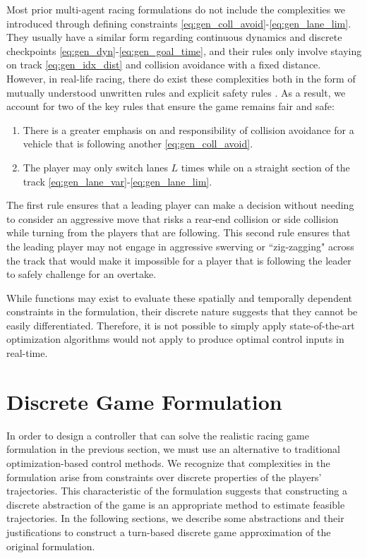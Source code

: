 Most prior multi-agent racing formulations \cite{Wang2019, Wang2021, Li2021} do not include the complexities we introduced through defining constraints \eqref{eq:gen_coll_avoid}-\eqref{eq:gen_lane_lim}. They usually have a similar form regarding continuous dynamics and discrete checkpoints \eqref{eq:gen_dyn}-\eqref{eq:gen_goal_time}, and their rules only involve staying on track \eqref{eq:gen_idx_dist} and collision avoidance with a fixed distance. However, in real-life racing, there do exist these complexities both in the form of mutually understood unwritten rules and explicit safety rules \cite{racingrules}. As a result, we account for two of the key rules that ensure the game remains fair and safe:
\begin{enumerate}
    \item There is a greater emphasis on and responsibility of collision avoidance for a vehicle that is following another \eqref{eq:gen_coll_avoid}.
    \item The player may only switch lanes $L$ times while on a straight section of the track \eqref{eq:gen_lane_var}-\eqref{eq:gen_lane_lim}.
\end{enumerate}

The first rule ensures that a leading player can make a decision without needing to consider an aggressive move that risks a rear-end collision or side collision while turning from the players that are following. This second rule ensures that the leading player may not engage in aggressive swerving or ``zig-zagging" across the track that would make it impossible for a player that is following the leader to safely challenge for an overtake. 

While functions may exist to evaluate these spatially and temporally dependent constraints in the formulation, their discrete nature suggests that they cannot be easily differentiated. Therefore, it is not possible to simply apply state-of-the-art optimization algorithms would not apply to produce optimal control inputs in real-time. 

\section{Discrete Game Formulation} \label{section:discgame}
In order to design a controller that can solve the realistic racing game formulation in the previous section, we must use an alternative to traditional optimization-based control methods. We recognize that complexities in the formulation arise from constraints over discrete properties of the players' trajectories. This characteristic of the formulation suggests that constructing a discrete abstraction of the game is an appropriate method to estimate feasible trajectories. In the following sections, we describe some abstractions and their justifications to construct a turn-based discrete game approximation of the original formulation. 


